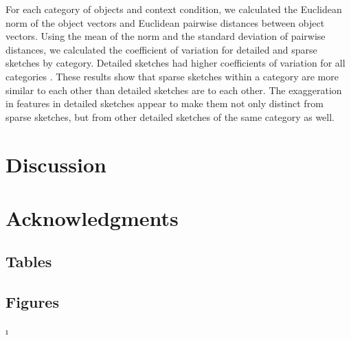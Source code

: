 \documentclass[10pt,letterpaper]{article}
\newcommand{\kushin}[1]{{\color{orange}{[kushin: #1]}}}
\begin{document}
For each category of objects and context condition, we calculated the Euclidean norm of the object vectors and Euclidean pairwise distances between object vectors. 
Using the mean of the norm and the standard deviation of pairwise distances, we calculated the coefficient of variation for detailed and sparse sketches by category. Detailed sketches had higher coefficients of variation for all categories \kushin{would report CV difference between close and far maybe?}.
These results show that sparse sketches within a category are more similar to each other than detailed sketches are to each other. 
The exaggeration in features in detailed sketches appear to make them not only distinct from sparse sketches, but from other detailed sketches of the same category as well.
 





\section{Discussion}

\section{Acknowledgments}

\subsection{Tables}

\subsection{Figures}




\setlength{\bibleftmargin}{.125in}
\setlength{\bibindent}{-\bibleftmargin}ı
\end{document}

